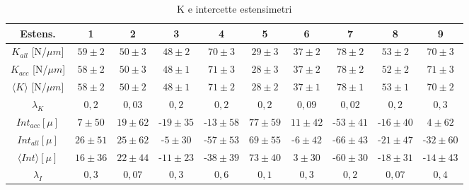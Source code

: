 \documentclass[a4paper,11pt,oneside]{article}
\begin{document}
\begin{table}[h!]
    \begin{center}
    \begin{tabular}{|c|c|c|c|c|c|c|c|c|c|}
        \hline
        Estens. &  1&    2&	3&	4&	5&	6&	7&	8&	9\\ \hline
        $K_{all}$	[N/$\mu m$]&	$59\pm2$&	$50\pm3$&	$48\pm2$&	$70\pm3$&	$29\pm3$&	$37\pm2$&	$78\pm2$&	$53\pm2$&	$70\pm3$\\
        $K_{acc}$	[N/$\mu m$]&	$58\pm2$&	$50\pm3$&	$48\pm1$&	$71\pm3$&	$28\pm3$&	$37\pm2$&	$78\pm2$&	$52\pm2$&	$71\pm3$\\
        $\langle K\rangle$ [N/$\mu m$]&	$58\pm2$&	$50\pm2$&	$48\pm1$&	$71\pm2$&	$28\pm2$&	$37\pm1$&	$78\pm1$&	$53\pm1$&   $70\pm2$\\
        $\lambda_K$& $0,2$&	$0,03$&	$0,2$& $0,2$&	$0,2$&	$0,09$&	$0,02$&	$0,2$&	$0,3$ \\
        \hline
        $Int_{acc}   [\mu]$&	$7\pm50$&	$19\pm62$&	-$19\pm35$&	-$13\pm58$&    $77\pm59$&	$11\pm42$&	-$53\pm41$&	-$16\pm40$&	$4\pm62$\\
        $Int_{all}	[\mu]$ &  $26\pm 51$&	$25\pm 62$&	-$5\pm30$&	-$57 \pm53$&	$69\pm55$&	-$6\pm42$&	-$66\pm43$&	-$21\pm47$&	-$32\pm60$\\
        $\langle Int\rangle [\mu]$&	$16\pm36$&	$22\pm44$&	-$11\pm23$&	-$38 \pm39$&	$73\pm40$&	$3\pm30$&	-$60\pm30$&	-$18\pm31$&	-$14\pm43$\\
        $\lambda_I$&    $0,3$&	$0,07$&	$0,3$&	$0,6$&	$0,1$&	$0,3$&	$0,2$&	$0,07$&	$0,4$\\
        \hline
    \end{tabular}
    \caption{K e intercette estensimetri}
    \label{tab:K_est}
    \end{center}
\end{table}{}
\end{document}
